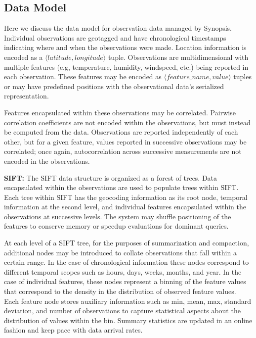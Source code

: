 \subsection{Data Model}
Here we discuss the data model for observation data managed by Synopsis. Individual observations are geotagged and have chronological timestamps indicating where and when the observations were made. Location information is encoded as a $\langle latitude, longitude \rangle$ tuple. Observations are multidimensional with multiple features (e.g, temperature, humidity, windspeed, etc.) being reported in each observation. These features may be encoded as $\langle feature\_name, value \rangle$ tuples or may have predefined positions with the observational data’s serialized representation. 

Features encapsulated within these observations may be correlated.  Pairwise correlation coefficients are not encoded within the observations, but must instead be computed from the data. Observations are reported independently of each other, but for a given feature, values reported in successive observations may be correlated; once again, autocorrelation across successive measurements are not encoded in the observations. 

\textbf{SIFT:} The SIFT data structure is organized as a forest of trees. Data encapsulated within the observations are used to populate trees within SIFT. Each tree within SIFT has the geocoding information as its root node, temporal information at the second level, and individual features encapsulated within the observations at successive levels. The system may shuffle positioning of the features to conserve memory or speedup evaluations for dominant queries.

At each level of a SIFT tree, for the purposes of summarization and compaction, additional nodes may be introduced to collate observations that fall within a certain range. In the case of chronological information these nodes correspond to different temporal scopes such as hours, days, weeks, months, and year. In the case of individual features, these nodes represent a binning of the feature values that correspond to the density in the distribution of observed feature values. Each feature node stores auxiliary information such as min, mean, max, standard deviation, and number of observations to capture statistical aspects about the distribution of values within the bin. Summary statistics are updated in an online fashion and keep pace with data arrival rates.

